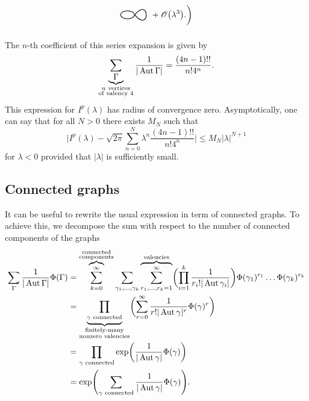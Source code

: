 \begin{example}
\begin{align*}
\begin{tikzpicture}[scale=2, baseline=-1mm]
        \draw[thick] (.3, 0) to[out=-50, in=50, loop] (.3, 0);
        \draw[thick] (0, 0) to[out=70, in=110] (.3, 0);
        \draw[thick] (0, 0) to[out=-70, in=-110] (.3, 0);
      \end{tikzpicture}
      + \Oscr \bigl(\lambda^3\bigr).
    \biggr) 
  \end{align*}
  The $n$-th coefficient of this series expansion is given by
  \begin{equation*}
    \sum_{\underbrace{\Gamma}_{\substack{n\text{ vertices} \\ \text{of valency } 4}}} \frac{1}{|\operatorname{Aut} \Gamma|}
    = \frac{(4n - 1)!!}{n! 4^n}.
  \end{equation*}
  This expression for $I^p (\lambda)$ has radius of convergence zero. Asymptotically, one can say that for all $N > 0$ there exists $M_N$ such that
  \begin{equation*}
    \biggl| I^p(\lambda) - \sqrt{2 \pi} \sum_{n=0}^N \lambda^n \frac{(4n - 1)!!}{n! 4^n} \biggr|
    \leq M_N |\lambda|^{N + 1}
  \end{equation*}
  for $\lambda < 0$ provided that $|\lambda|$ is sufficiently small.
\end{example}

\subsection{Connected graphs}

It can be useful to rewrite the usual expression in term of connected graphs. To achieve this, we decompose the sum with respect to the number of connected components of the graphs
\begin{align*}
  \sum_{\Gamma} \frac{1}{|\operatorname{Aut} \Gamma|} \Phi(\Gamma)
  &= \overbrace{\sum_{k = 0}^\infty}^{\substack{\text{connected}\\ \text{components}}}
  \sum_{\gamma_1, \dots, \gamma_k}
  \overbrace{\sum_{r_1, \dots, r_k = 1}^\infty}^{\text{valencies}}
  \biggl( \prod_{i=1}^k \frac{1}{r_i! |\operatorname{Aut} \gamma_i|} \biggr) \Phi(\gamma_1)^{r_1} \dots \Phi(\gamma_k)^{r_k} \\
  &= \underbrace{\prod_{\gamma \text{ connected}}}_{\substack{\text{finitely-many} \\ \text{nonzero valencies}}}
    \biggl( \sum_{r=0}^\infty \frac{1}{r! |\operatorname{Aut} \gamma|^r} \Phi(\gamma)^r \biggr) \\
  &= \prod_{\gamma \text{ connected}} \exp \biggl( \frac{1}{|\operatorname{Aut} \gamma|} \Phi(\gamma) \biggr) \\
  &= \exp \Biggl( \sum_{\gamma \text{ connected}} \frac{1}{|\operatorname{Aut} \gamma|} \Phi(\gamma) \Biggr).
\end{align*}

